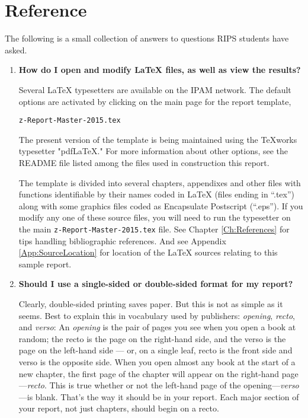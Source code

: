 \chapter{Reference}\label{Ch:ExtraAdvice}

The following is a small collection of answers to questions RIPS students have asked.

\begin{enumerate}

\item {\bf How do I open and modify {\LaTeX} files, as well as view the results?}

Several {\LaTeX} typesetters are available on the IPAM network.
The default options are activated by clicking on the  main page for the report template,\\ 

\centerline{\texttt{z-Report-Master-2015.tex}}
\vspace{5pt}

The present version of the template is being maintained using the TeXworks typesetter "pdfLaTeX."
For more information about other options, see the  README file listed among the files used in construction this report.

\hspace{15pt} The template is divided into several chapters, appendixes and other files with functions identifiable by their names coded in {\LaTeX} (files ending in ``.tex'') along with some graphics files coded as Encapsulate Postscript (``.eps'').  
If you modify any one of these source files, you will need to run the typesetter on the main \texttt{z-Report-Master-2015.tex} file.
See Chapter \ref{Ch:References} for tips handling bibliographic references.
And see Appendix \ref{App:SourceLocation} for location of the {\LaTeX} sources relating to this sample report.

\item {\bf Should I use a single-sided or double-sided format for my report?}

Clearly, double-sided printing saves paper.
But this is not as simple as it seems.
Best to explain this in vocabulary used by publishers: {\em opening}, {\em recto}, and {\em verso}:
An {\em opening} is the pair of pages you see when you open a book at random; the recto is the page on the right-hand side, and the verso is the page on the left-hand side --- or, on a single leaf, recto is the front side and verso is the opposite side.
When you open almost any book at the start of a new chapter, the first page of the chapter will appear on the right-hand page---{\em recto}.
This is true whether or not the left-hand page of the opening---{\em verso}---is blank.
That's the way it should be in your report.
Each major section of your report, not just chapters, should begin on a recto.


\end{enumerate}
